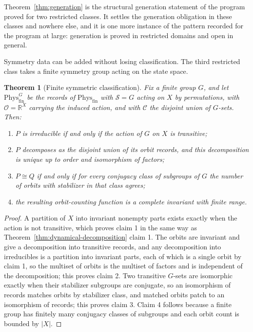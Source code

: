 \documentclass[11pt,letterpaper]{article}
\newtheorem{theorem}{Theorem}[section]
\theoremstyle{definition}
\theoremstyle{remark}
\begin{document}
Theorem~\ref{thm:generation} is the structural generation statement of the program proved for two restricted classes. It settles the generation obligation in these classes and nowhere else, and it is one more instance of the pattern recorded for the program at large: generation is proved in restricted domains and open in general.

Symmetry data can be added without losing classification. The third restricted class takes a finite symmetry group acting on the state space.

\begin{theorem}[Finite symmetric classification]
\label{thm:symmetric-classification}
Fix a finite group $G$, and let $\mathrm{Phys}^{G}_{\mathrm{fin}}$ be the records of $\mathrm{Phys}_{\mathrm{fin}}$ with $\mathcal{S} = G$ acting on $X$ by permutations, with $\mathcal{O} = \mathbb{R}^{X}$ carrying the induced action, and with $\mathcal{C}$ the disjoint union of $G$-sets. Then:
\begin{enumerate}
\item $P$ is irreducible if and only if the action of $G$ on $X$ is transitive;
\item $P$ decomposes as the disjoint union of its orbit records, and this decomposition is unique up to order and isomorphism of factors;
\item $P \cong Q$ if and only if for every conjugacy class of subgroups of $G$ the number of orbits with stabilizer in that class agrees;
\item the resulting orbit-counting function is a complete invariant with finite range.
\end{enumerate}
\end{theorem}

\begin{proof}
A partition of $X$ into invariant nonempty parts exists exactly when the action is not transitive, which proves claim 1 in the same way as Theorem~\ref{thm:dynamical-decomposition} claim 1. The orbits are invariant and give a decomposition into transitive records, and any decomposition into irreducibles is a partition into invariant parts, each of which is a single orbit by claim 1, so the multiset of orbits is the multiset of factors and is independent of the decomposition; this proves claim 2. Two transitive $G$-sets are isomorphic exactly when their stabilizer subgroups are conjugate, so an isomorphism of records matches orbits by stabilizer class, and matched orbits patch to an isomorphism of records; this proves claim 3. Claim 4 follows because a finite group has finitely many conjugacy classes of subgroups and each orbit count is bounded by $|X|$.
\end{proof}
\end{document}
